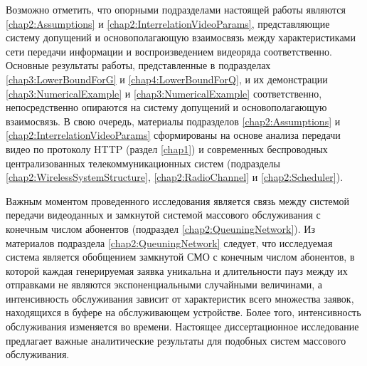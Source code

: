 Возможно отметить, что опорными подразделами настоящей работы являются \ref{chap2:Assumptions} и \ref{chap2:InterrelationVideoParams}, представляющие систему допущений и основополагающую взаимосвязь между характеристиками сети передачи информации и воспроизведением видеоряда соответственно. Основные результаты работы, представленные в подразделах \ref{chap3:LowerBoundForG} и \ref{chap4:LowerBoundForQ}, и их демонстрации \ref{chap3:NumericalExample} и \ref{chap3:NumericalExample} соответственно, непосредственно опираются на систему допущений и основополагающую взаимосвязь. В свою очередь, материалы подразделов \ref{chap2:Assumptions} и \ref{chap2:InterrelationVideoParams} сформированы на основе анализа передачи видео по протоколу HTTP (раздел \ref{chap1}) и современных беспроводных централизованных телекоммуникационных систем (подразделы \ref{chap2:WirelessSystemStructure}, \ref{chap2:RadioChannel} и \ref{chap2:Scheduler}).

Важным моментом проведенного исследования является связь между системой передачи видеоданных и замкнутой системой массового обслуживания с конечным числом абонентов (подраздел \ref{chap2:QueuningNetwork}). Из материалов подраздела \ref{chap2:QueuningNetwork} следует, что исследуемая система является обобщением замкнутой СМО с конечным числом абонентов, в которой каждая генерируемая заявка уникальна и длительности пауз между их отправками не являются экспоненциальными случайными величинами, а интенсивность обслуживания зависит от характеристик всего множества заявок, находящихся в буфере на обслуживающем устройстве. Более того, интенсивность обслуживания изменяется во времени. Настоящее диссертационное исследование предлагает важные аналитические результаты для подобных систем массового обслуживания.